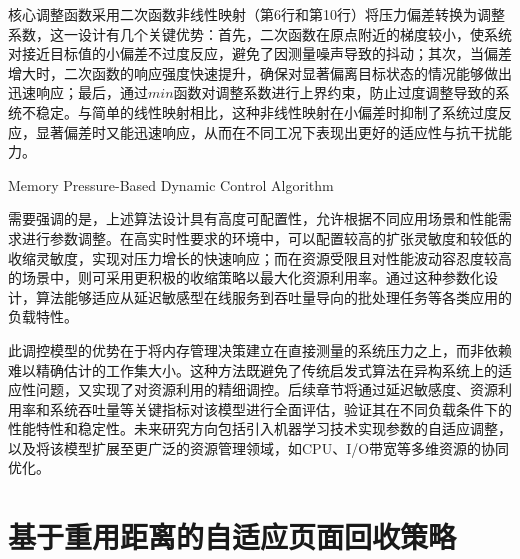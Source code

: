 核心调整函数采用二次函数非线性映射（第6行和第10行）将压力偏差转换为调整系数，这一设计有几个关键优势：首先，二次函数在原点附近的梯度较小，使系统对接近目标值的小偏差不过度反应，避免了因测量噪声导致的抖动；其次，当偏差增大时，二次函数的响应强度快速提升，确保对显著偏离目标状态的情况能够做出迅速响应；最后，通过\(min\)函数对调整系数进行上界约束，防止过度调整导致的系统不稳定。与简单的线性映射相比，这种非线性映射在小偏差时抑制了系统过度反应，显著偏差时又能迅速响应，从而在不同工况下表现出更好的适应性与抗干扰能力。
\begin{algorithm}[htb]
  \caption{Memory Pressure-Based Dynamic Control Algorithm}
  \label{alg:control}
\end{algorithm}

需要强调的是，上述算法设计具有高度可配置性，允许根据不同应用场景和性能需求进行参数调整。在高实时性要求的环境中，可以配置较高的扩张灵敏度和较低的收缩灵敏度，实现对压力增长的快速响应；而在资源受限且对性能波动容忍度较高的场景中，则可采用更积极的收缩策略以最大化资源利用率。通过这种参数化设计，算法能够适应从延迟敏感型在线服务到吞吐量导向的批处理任务等各类应用的负载特性。

此调控模型的优势在于将内存管理决策建立在直接测量的系统压力之上，而非依赖难以精确估计的工作集大小。这种方法既避免了传统启发式算法在异构系统上的适应性问题，又实现了对资源利用的精细调控。后续章节将通过延迟敏感度、资源利用率和系统吞吐量等关键指标对该模型进行全面评估，验证其在不同负载条件下的性能特性和稳定性。未来研究方向包括引入机器学习技术实现参数的自适应调整，以及将该模型扩展至更广泛的资源管理领域，如CPU、I/O带宽等多维资源的协同优化。

\section{基于重用距离的自适应页面回收策略}
\label{sec:基于重用距离的冷热页面优化}

